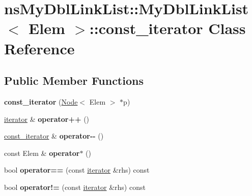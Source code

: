 \hypertarget{classnsMyDblLinkList_1_1MyDblLinkList_1_1const__iterator}{\section{ns\-My\-Dbl\-Link\-List\-:\-:My\-Dbl\-Link\-List$<$ Elem $>$\-:\-:const\-\_\-iterator Class Reference}
\label{classnsMyDblLinkList_1_1MyDblLinkList_1_1const__iterator}
}
\subsection*{Public Member Functions}
\begin{DoxyCompactItemize}
\item 
\hypertarget{classnsMyDblLinkList_1_1MyDblLinkList_1_1const__iterator_a9e008134378bcae5c1c16d14a9467089}{{\bfseries const\-\_\-iterator} (\hyperlink{structnsMyDblLinkList_1_1Node}{Node}$<$ Elem $>$ $\ast$p)}\label{classnsMyDblLinkList_1_1MyDblLinkList_1_1const__iterator_a9e008134378bcae5c1c16d14a9467089}

\item 
\hypertarget{classnsMyDblLinkList_1_1MyDblLinkList_1_1const__iterator_a638bab6cee4e0c37567634cc3290706d}{\hyperlink{classnsMyDblLinkList_1_1MyDblLinkList_1_1iterator}{iterator} \& {\bfseries operator++} ()}\label{classnsMyDblLinkList_1_1MyDblLinkList_1_1const__iterator_a638bab6cee4e0c37567634cc3290706d}

\item 
\hypertarget{classnsMyDblLinkList_1_1MyDblLinkList_1_1const__iterator_a1fe3a2d04052d69245bb42b33d9c60d1}{\hyperlink{classnsMyDblLinkList_1_1MyDblLinkList_1_1const__iterator}{const\-\_\-iterator} \& {\bfseries operator-\/-\/} ()}\label{classnsMyDblLinkList_1_1MyDblLinkList_1_1const__iterator_a1fe3a2d04052d69245bb42b33d9c60d1}

\item 
\hypertarget{classnsMyDblLinkList_1_1MyDblLinkList_1_1const__iterator_ad2e81f125a9ed02ba82c496f0224e89f}{const Elem \& {\bfseries operator$\ast$} ()}\label{classnsMyDblLinkList_1_1MyDblLinkList_1_1const__iterator_ad2e81f125a9ed02ba82c496f0224e89f}

\item 
\hypertarget{classnsMyDblLinkList_1_1MyDblLinkList_1_1const__iterator_a22f2620df51d583f0a4f32b9c7bfea9b}{bool {\bfseries operator==} (const \hyperlink{classnsMyDblLinkList_1_1MyDblLinkList_1_1iterator}{iterator} \&rhs) const }\label{classnsMyDblLinkList_1_1MyDblLinkList_1_1const__iterator_a22f2620df51d583f0a4f32b9c7bfea9b}

\item 
\hypertarget{classnsMyDblLinkList_1_1MyDblLinkList_1_1const__iterator_a944ed6de382a995375e403e8f018608f}{bool {\bfseries operator!=} (const \hyperlink{classnsMyDblLinkList_1_1MyDblLinkList_1_1iterator}{iterator} \&rhs) const }\label{classnsMyDblLinkList_1_1MyDblLinkList_1_1const__iterator_a944ed6de382a995375e403e8f018608f}

\end{DoxyCompactItemize}


